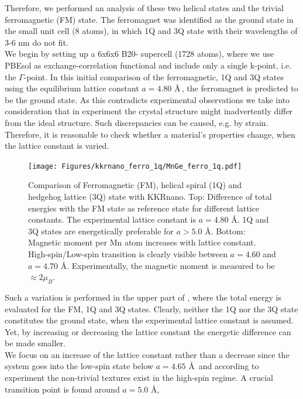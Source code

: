 \documentclass [a4paper, 12pt]{article}
\begin{document}
Therefore, we performed
an analysis of these two helical states and the trivial ferromagnetic (FM) state.
The ferromagnet was identified as the ground state in the small unit cell (8 atoms), 
in which 1Q and 3Q state with their wavelengths of
3-6 nm do not fit.
\\
We begin by setting up a 6x6x6 B20- supercell (1728 atoms), where we use PBEsol 
as exchange-correlation functional
and include only a single k-point, i.e. the $\Gamma$-point.
In this initial comparison of the ferromagnetic, 1Q and 3Q states using the equilibrium lattice constant
$a=4.80$ \AA \,, the ferromagnet is predicted to be the ground state.
As this contradicts experimental observations we take into consideration that
in experiment the crystal structure might inadvertently differ from the ideal structure.
Such discrepancies can be caused, e.g. by strain.
\\
Therefore, it is reasonable to check whether a material's properties change, when the
lattice constant is varied.
\begin{figure}[h]
\begin{center}
 \texttt{[image: Figures/kkrnano\_ferro\_1q/MnGe\_ferro\_1q.pdf]}
\end{center}
\caption{
	Comparison of Ferromagnetic (FM), helical spiral (1Q) and hedgehog lattice (3Q) state with KKRnano.
	Top: Difference of total energies with the FM state as reference state for different lattice constants. 
	The experimental lattice constant is $a = 4.80$ \AA. 1Q and 3Q states are energetically preferable 
	for $a > 5.0$ \AA. Bottom: Magnetic moment per Mn atom increases with lattice constant. 
	High-spin/Low-spin transition is clearly visible between $a = 4.60$ and $a = 4.70$ \AA.
	Experimentally, the magnetic moment is measured to be $\approx 2 \mu_{B}$.
	}
\label{fig:MnGe_ferro_1q}
\end{figure}
Such a variation is performed in the upper part of , where
the total energy is evaluated for the FM, 1Q and 3Q states.
Clearly, neither the 1Q nor the 3Q state constitutes the ground state,
when the experimental lattice constant is assumed.
Yet, by increasing or decreasing the lattice constant the energetic difference can be made
smaller.
\\
We focus on an increase of the lattice constant rather than a decrease since 
the system goes into the low-spin state below $a=4.65$ \AA \, and according to experiment
the non-trivial textures
exist in the high-spin regime.
A crucial transition point is found around $a=5.0$ \AA,
\end{document}
